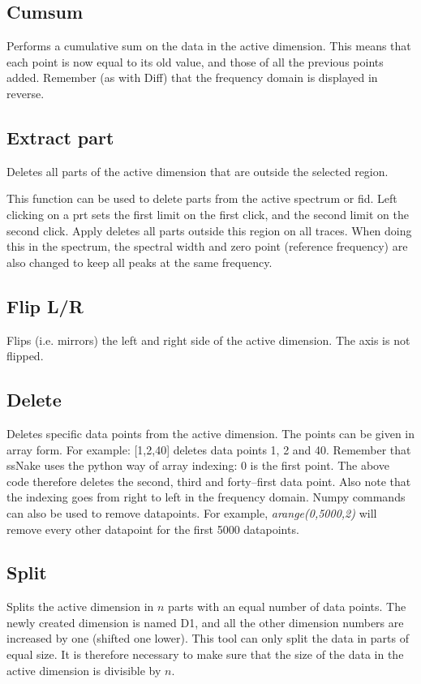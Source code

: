 \documentclass[11pt,a4paper]{article}
\begin{document}
\subsection{Cumsum}
Performs a cumulative sum on the data in the active dimension.
This means that each point is now equal to its old value, and those of all the previous points added.
Remember (as with Diff) that the frequency domain is displayed in reverse.


\subsection{Extract part}
Deletes all parts of the active dimension that are outside the selected region.

This function can be used to delete parts from the active spectrum or fid.
Left clicking on a prt sets the first limit on the first click, and the second limit on the second click.
Apply deletes all parts outside this region on all traces.
When doing this in the spectrum, the spectral width and zero point (reference frequency) are also changed to keep all peaks at the same frequency.

\subsection{Flip L/R}
Flips (i.e. mirrors) the left and right side of the active dimension.
The axis is not flipped.

\subsection{Delete}
Deletes specific data points from the active dimension.
The points can be given in array form.
For example: [1,2,40] deletes data points 1, 2 and 40.
Remember that ssNake uses the python way of array indexing: 0 is the first point.
The above code therefore deletes the second, third and forty--first data point.
Also note that the indexing goes from right to left in the frequency domain.
Numpy commands can also be used to remove datapoints.
For example, \textit{arange(0,5000,2)} will remove every other datapoint for the first 5000 datapoints.

\subsection{Split}
Splits the active dimension in $n$ parts with an equal number of data points.
The newly created dimension is named D1, and all the other dimension numbers are increased by one (shifted one lower).
This tool can only split the data in parts of equal size.
It is therefore necessary to make sure that the size of the data in the active dimension is divisible by $n$.
\end{document}
